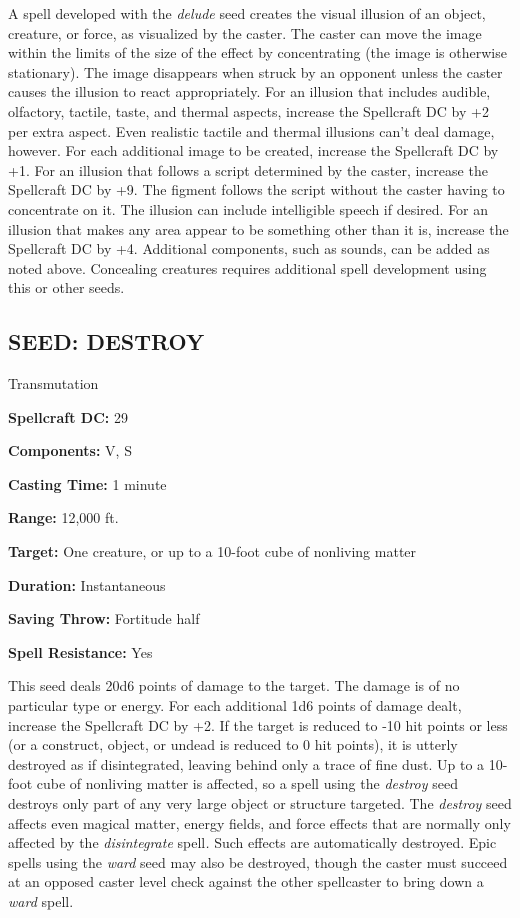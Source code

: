 \documentclass{article}
\begin{document}
A spell developed with the \textit{delude }seed creates the visual illusion of 
an object, creature, or force, as visualized by the caster. The caster can move 
the image within the limits of the size of the effect by concentrating (the image 
is otherwise stationary). The image disappears when struck by an opponent unless 
the caster causes the illusion to react appropriately. For an illusion that includes 
audible, olfactory, tactile, taste, and thermal aspects, increase the Spellcraft 
DC by +2 per extra aspect. Even realistic tactile and thermal illusions can't deal 
damage, however. For each additional image to be created, increase the Spellcraft 
DC by +1. For an illusion that follows a script determined by the caster, increase 
the Spellcraft DC by +9. The figment follows the script without the caster having 
to concentrate on it. The illusion can include intelligible speech if desired. 
For an illusion that makes any area appear to be something other than it is, increase 
the Spellcraft DC by +4. Additional components, such as sounds, can be added as 
noted above. Concealing creatures requires additional spell development using this 
or other seeds. 

\vspace{12pt}
\subsection*{SEED: DESTROY }

Transmutation 

\textbf{Spellcraft DC:} 29 

\textbf{Components:} V, S 

\textbf{Casting Time:} 1 minute 

\textbf{Range:} 12,000 ft. 

\textbf{Target:} One creature, or up to a 10-foot cube of nonliving matter 

\textbf{Duration:} Instantaneous 

\textbf{Saving Throw:} Fortitude half 

\textbf{Spell Resistance:} Yes 

This seed deals 20d6 points of damage to the target. The damage is of no particular 
type or energy. For each additional 1d6 points of damage dealt, increase the Spellcraft 
DC by +2. If the target is reduced to -10 hit points or less (or a construct, object, 
or undead is reduced to 0 hit points), it is utterly destroyed as if disintegrated, 
leaving behind only a trace of fine dust. Up to a 10-foot cube of nonliving matter 
is affected, so a spell using the \textit{destroy }seed destroys only part of any 
very large object or structure targeted. The \textit{destroy }seed affects even 
magical matter, energy fields, and force effects that are normally only affected 
by the \textit{disintegrate }spell\textit{. }Such effects are automatically destroyed. 
Epic spells using the \textit{ward }seed may also be destroyed, though the caster 
must succeed at an opposed caster level check against the other spellcaster to 
bring down a \textit{ward }spell. 
\end{document}
